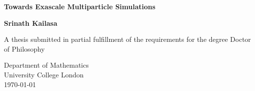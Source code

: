 \begin{titlepage}
    \begin{center}
        \vspace*{1cm}

        \Huge
        \textbf{Towards Exascale Multiparticle Simulations}

        \Large
        \vspace{0.5cm}

        \vfill

        \textbf{Srinath Kailasa}

        \vspace{5cm}

        A thesis submitted in partial fulfillment of the requirements for the
        degree Doctor of Philosophy 

        \vspace{0.8cm}


        \large
        Department of Mathematics\\
        University College London\\
        \monthyeardate\today

    \end{center}
 \end{titlepage}
